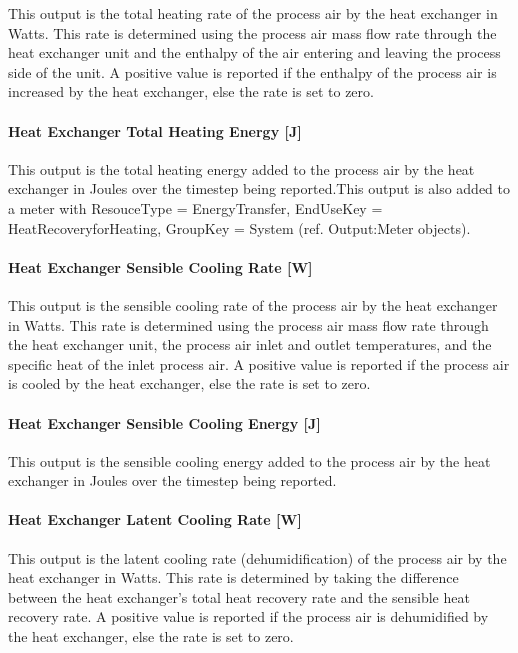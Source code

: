 This output is the total heating rate of the process air by the heat exchanger in Watts. This rate is determined using the process air mass flow rate through the heat exchanger unit and the enthalpy of the air entering and leaving the process side of the unit. A positive value is reported if the enthalpy of the process air is increased by the heat exchanger, else the rate is set to zero.

\paragraph{Heat Exchanger Total Heating Energy {[}J{]}}\label{heat-exchanger-total-heating-energy-j-2}

This output is the total heating energy added to the process air by the heat exchanger in Joules over the timestep being reported.This output is also added to a meter with ResouceType = EnergyTransfer, EndUseKey = HeatRecoveryforHeating, GroupKey = System (ref. Output:Meter objects).

\paragraph{Heat Exchanger Sensible Cooling Rate {[}W{]}}\label{heat-exchanger-sensible-cooling-rate-w-2}

This output is the sensible cooling rate of the process air by the heat exchanger in Watts. This rate is determined using the process air mass flow rate through the heat exchanger unit, the process air inlet and outlet temperatures, and the specific heat of the inlet process air. A positive value is reported if the process air is cooled by the heat exchanger, else the rate is set to zero.

\paragraph{Heat Exchanger Sensible Cooling Energy {[}J{]}}\label{heat-exchanger-sensible-cooling-energy-j-2}

This output is the sensible cooling energy added to the process air by the heat exchanger in Joules over the timestep being reported.

\paragraph{Heat Exchanger Latent Cooling Rate {[}W{]}}\label{heat-exchanger-latent-cooling-rate-w-2}

This output is the latent cooling rate (dehumidification) of the process air by the heat exchanger in Watts. This rate is determined by taking the difference between the heat exchanger's total heat recovery rate and the sensible heat recovery rate. A positive value is reported if the process air is dehumidified by the heat exchanger, else the rate is set to zero.

